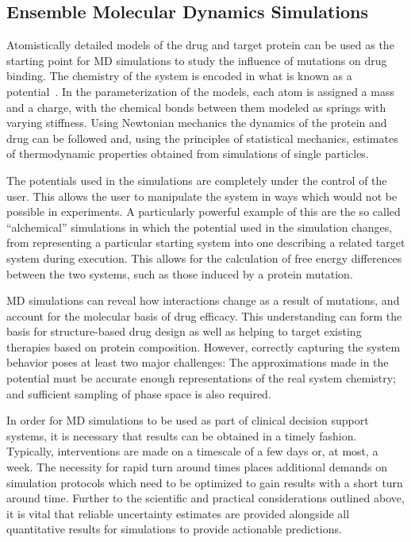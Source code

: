 \documentclass{bmcart}
\begin{document}
\subsection{Ensemble Molecular Dynamics Simulations}

Atomistically detailed models of the drug and target protein can be used as the
starting point for MD simulations to
study the influence of mutations on drug binding. The chemistry of the system
is encoded in what is known as a potential~\cite{Karplus2002}. In the
parameterization of the models, each atom is assigned a mass and a charge,
with the chemical bonds between them modeled as springs with varying
stiffness. Using Newtonian mechanics the dynamics of the protein and drug can
be followed and, using the principles of statistical mechanics, estimates of
thermodynamic properties obtained from simulations of single particles.

The potentials used in the simulations are completely under the control of
the user. This allows the user to manipulate the system in ways which would
not be possible in experiments. A particularly powerful example of this are
the so called ``alchemical'' simulations in which the potential used in the
simulation changes, from representing a particular starting system into one 
describing a related target system during execution. This allows for the 
calculation of free energy differences between the two systems, such as those 
induced by a protein mutation.

MD simulations can reveal how interactions change as a result of mutations,
and account for the molecular basis of drug efficacy. This understanding can
form the basis for structure-based drug design as well as helping to target
existing therapies based on protein composition. However, correctly capturing
the system behavior poses at least two major challenges: The approximations
made in the potential must be accurate enough representations of the real
system chemistry; and sufficient sampling of phase space is also required.

In order for MD simulations to be used as part of clinical decision support
systems, it is necessary that results can be obtained in a timely fashion.
Typically, interventions are made on a timescale of a few days or, at most, a
week. The necessity for rapid turn around times places additional demands on
simulation protocols which need to be optimized to gain results with a short
turn around time. Further to the scientific and practical considerations
outlined above, it is vital that reliable uncertainty estimates are
provided alongside all quantitative results for simulations to provide
actionable predictions.
\end{document}
